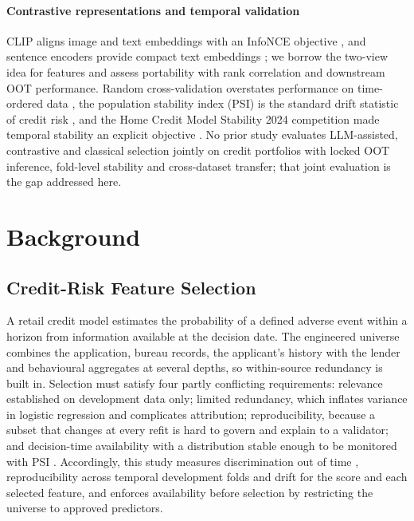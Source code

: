 \documentclass[final,5p,twocolumn]{elsarticle}
\begin{document}
\paragraph{Contrastive representations and temporal validation}
CLIP aligns image and text embeddings with an InfoNCE objective \cite{radford2021,oord2018}, and sentence encoders provide compact text embeddings \cite{reimers2019,wang2020minilm}; we borrow the two-view idea for features and assess portability with rank correlation \cite{spearman1904} and downstream OOT performance. Random cross-validation overstates performance on time-ordered data \cite{bergmeir2012,gama2014}, the population stability index (PSI) is the standard drift statistic of credit risk \cite{yurdakul2020}, and the Home Credit Model Stability 2024 competition made temporal stability an explicit objective \cite{homecredit2024}. No prior study evaluates LLM-assisted, contrastive and classical selection jointly on credit portfolios with locked OOT inference, fold-level stability and cross-dataset transfer; that joint evaluation is the gap addressed here.


\section{Background}
\label{sec:background}

\subsection{Credit-Risk Feature Selection}
\label{subsec:credit_risk_fs}

A retail credit model estimates the probability of a defined adverse event within a horizon from information available at the decision date. The engineered universe combines the application, bureau records, the applicant's history with the lender and behavioural aggregates at several depths, so within-source redundancy is built in. Selection must satisfy four partly conflicting requirements: relevance established on development data only; limited redundancy, which inflates variance in logistic regression and complicates attribution; reproducibility, because a subset that changes at every refit is hard to govern and explain to a validator; and decision-time availability with a distribution stable enough to be monitored with PSI \cite{siddiqi2006,thomas2002,yurdakul2020}. Accordingly, this study measures discrimination out of time \cite{bergmeir2012}, reproducibility across temporal development folds and drift for the score and each selected feature, and enforces availability before selection by restricting the universe to approved predictors.
\end{document}

